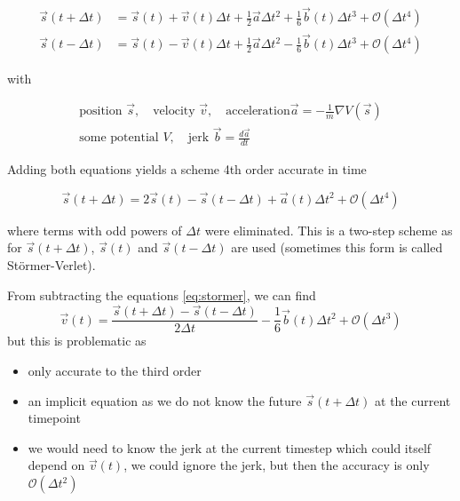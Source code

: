 \begin{equation}
  \label{eq:stormer}
  \begin{aligned}
    \vec{s}(t+\Delta t) &= \vec{s}(t) + \vec{v}(t)\Delta t + \frac{1}{2} \vec{a} \Delta t^2 + \frac{1}{6} \vec{b}(t) \Delta t^3 + \mathcal{O}(\Delta t^4) \\
    \vec{s}(t-\Delta t) &= \vec{s}(t) - \vec{v}(t)\Delta t + \frac{1}{2} \vec{a} \Delta t^2 - \frac{1}{6} \vec{b}(t) \Delta t^3 + \mathcal{O}(\Delta t^4)
  \end{aligned}
\end{equation}

with

\begin{equation}
  \begin{gathered}
    \text{position } \vec{s}, \quad \text{velocity } \vec{v}, \quad \text{acceleration} \vec{a} = - \frac{1}{m} \nabla V(\vec{s}) \\
    \text{some potential } V, \quad \text{jerk } \vec{b} = \frac{d\vec{a}}{dt}
  \end{gathered}
\end{equation}

Adding both equations yields a scheme 4th order accurate in time

\begin{equation}
  \vec{s}(t+\Delta t) = 2 \vec{s}(t) - \vec{s}(t-\Delta t) + \vec{a}(t) \Delta t^2 + \mathcal{O}(\Delta t^4)
\end{equation}

where terms with odd powers of $\Delta t$ were eliminated. This is a two-step scheme as for $\vec{s}(t+\Delta t)$, $\vec{s}(t)$ and $\vec{s}(t-\Delta t)$
are used (sometimes this form is called Störmer-Verlet).


From subtracting the equations \ref{eq:stormer}, we can find
\begin{equation}
  \vec{v}(t) = \frac{\vec{s}(t+\Delta t) - \vec{s}(t - \Delta t)}{2 \Delta t} - \frac{1}{6} \vec{b}(t) \Delta t^2 + \mathcal{O}(\Delta t^3)
\end{equation}
but this is problematic as
\begin{itemize}
  \item \textcolor{red1}{only accurate to the third order}
  \item \textcolor{red1}{an implicit equation as we do not know the future $\vec{s}(t+\Delta t)$ at the current timepoint}
  \item \textcolor{red1}{we would need to know the jerk at the current timestep which could itself depend on $\vec{v}(t)$}, \textcolor{green1}{we could
  ignore the jerk}, \textcolor{red1}{but then the accuracy is only $\mathcal{O}(\Delta t^2)$}
\end{itemize}

